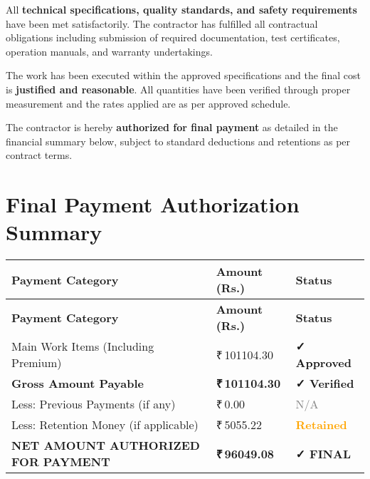 \documentclass[12pt,a4paper]{article}
\newcommand{\rupees}[1]{₹\,#1}
\begin{document}
\begin{center}
{\begin{minipage}{0.95\textwidth}
All \textbf{technical specifications, quality standards, and safety requirements} have been met satisfactorily. The contractor has fulfilled all contractual obligations including submission of required documentation, test certificates, operation manuals, and warranty undertakings.

\vspace{0.5cm}

The work has been executed within the approved specifications and the final cost is \textbf{justified and reasonable}. All quantities have been verified through proper measurement and the rates applied are as per approved schedule.

\vspace{0.5cm}

The contractor is hereby \textbf{authorized for final payment} as detailed in the financial summary below, subject to standard deductions and retentions as per contract terms.

\vspace{1cm}
\section*{Final Payment Authorization Summary}

\begin{center}
\begin{longtable}{|p{8cm}|p{3cm}|p{2.5cm}|}
\hline
\rowcolor{finalgreen!20}
\textbf{Payment Category} & \textbf{Amount (Rs.)} & \textbf{Status} \\
\hline
\endfirsthead

\hline
\rowcolor{finalgreen!20}
\textbf{Payment Category} & \textbf{Amount (Rs.)} & \textbf{Status} \\
\hline
\endhead

\hline
\endfoot

\hline
\endlastfoot

Main Work Items (Including Premium) & \rupees{101104.30} & \textcolor{finalgreen}{\textbf{✓ Approved}} \\
\hline
\rowcolor{lightgray}
\textbf{Gross Amount Payable} & \textbf{\rupees{101104.30}} & \textcolor{finalgreen}{\textbf{✓ Verified}} \\
\hline
Less: Previous Payments (if any) & \rupees{0.00} & \textcolor{gray}{N/A} \\
\hline
Less: Retention Money (if applicable) & \rupees{5055.22} & \textcolor{orange}{\textbf{Retained}} \\
\hline
\rowcolor{finalgreen!30}
\textbf{NET AMOUNT AUTHORIZED FOR PAYMENT} & \textbf{\rupees{96049.08}} & \textcolor{finalgreen}{\textbf{✓ FINAL}} \\
\hline
\end{longtable}
\end{center}


\end{minipage}}
\end{center}
\end{document}
